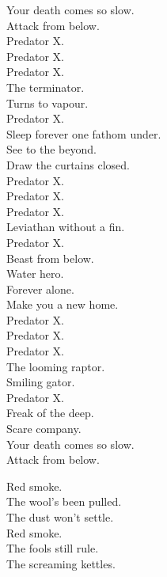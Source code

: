 Your death comes so slow. \\
Attack from below. \\

Predator X. \\
Predator X. \\
Predator X. \\
The terminator. \\
Turns to vapour. \\
Predator X. \\
Sleep forever one fathom under. \\

See to the beyond. \\
Draw the curtains closed. \\

Predator X. \\
Predator X. \\
Predator X. \\
Leviathan without a fin. \\
Predator X. \\
Beast from below. \\
Water hero. \\

Forever alone. \\
Make you a new home. \\

Predator X. \\
Predator X. \\
Predator X. \\
The looming raptor. \\
Smiling gator. \\
Predator X. \\
Freak of the deep. \\
Scare company. \\

Your death comes so slow. \\
Attack from below. \\




Red smoke. \\
The wool's been pulled. \\
The dust won't settle. \\
Red smoke. \\
The fools still rule. \\
The screaming kettles. \\

